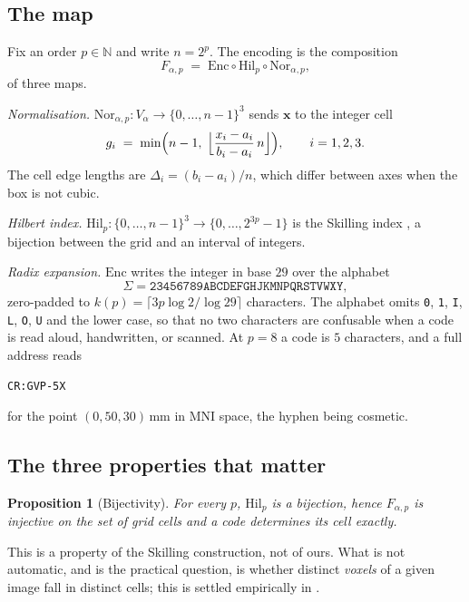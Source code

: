 \documentclass[11pt,a4paper]{article}
\theoremstyle{plain}
\newtheorem{proposition}[theorem]{Proposition}
\theoremstyle{definition}
\theoremstyle{remark}
\newcommand{\Nat}{\mathbb{N}}
\begin{document}
\subsection{The map}

Fix an order $p\in\Nat$ and write $n=2^p$. The encoding is the composition
\[
F_{\alpha,p}\;=\;\mathrm{Enc}\circ\mathrm{Hil}_p\circ\mathrm{Nor}_{\alpha,p},
\]
of three maps.

\emph{Normalisation.} $\mathrm{Nor}_{\alpha,p}:V_\alpha\to\{0,\dots,n-1\}^3$
sends $\mathbf{x}$ to the integer cell
\[
g_i \;=\; \min\Bigl(n-1,\;
   \Bigl\lfloor \frac{x_i-a_i}{b_i-a_i}\,n \Bigr\rfloor\Bigr),
\qquad i=1,2,3 .
\]
The cell edge lengths are $\Delta_i=(b_i-a_i)/n$, which differ between axes
when the box is not cubic.

\emph{Hilbert index.} $\mathrm{Hil}_p:\{0,\dots,n-1\}^3\to\{0,\dots,2^{3p}-1\}$
is the Skilling index \cite{skilling}, a bijection between the grid and an
interval of integers.

\emph{Radix expansion.} $\mathrm{Enc}$ writes the integer in base $29$ over
the alphabet
\[
\Sigma=\texttt{23456789ABCDEFGHJKMNPQRSTVWXY},
\]
zero-padded to
$k(p)=\lceil 3p\log 2/\log 29\rceil$ characters. The alphabet omits
\texttt{0}, \texttt{1}, \texttt{I}, \texttt{L}, \texttt{O}, \texttt{U} and
the lower case, so that no two characters are confusable when a code is
read aloud, handwritten, or scanned. At $p=8$ a code is $5$ characters, and
a full address reads
\begin{center}
\texttt{CR:GVP-5X}
\end{center}
for the point $(0,50,30)$\,mm in MNI space, the hyphen being cosmetic.

\subsection{The three properties that matter}

\begin{proposition}[Bijectivity]\label{prop:bij}
For every $p$, $\mathrm{Hil}_p$ is a bijection, hence $F_{\alpha,p}$ is
injective on the set of grid cells and a code determines its cell exactly.
\end{proposition}

This is a property of the Skilling construction, not of ours. What is not
automatic, and is the practical question, is whether distinct \emph{voxels}
of a given image fall in distinct cells; this is settled empirically in
.
\end{document}
